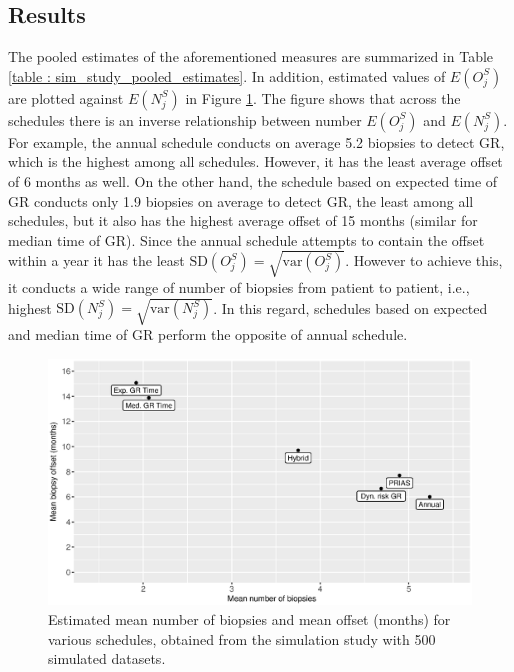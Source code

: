 \subsection{Results}
The pooled estimates of the aforementioned measures are summarized in Table \ref{table : sim_study_pooled_estimates}. In addition, estimated values of $E(O^S_j)$ are plotted against $E(N^S_j)$ in Figure \ref{fig : meanNbVsOffset}. The figure shows that across the schedules there is an inverse relationship between number $E(O^S_j)$ and $E(N^S_j)$. For example, the annual schedule conducts on average 5.2 biopsies to detect GR, which is the highest among all schedules. However, it has the least average offset of 6 months as well. On the other hand, the schedule based on expected time of GR conducts only 1.9 biopsies on average to detect GR, the least among all schedules, but it also has the highest average offset of 15 months (similar for median time of GR). Since the annual schedule attempts to contain the offset within a year it has the least $\mbox{SD}(O^S_j) = \sqrt{\mbox{var}(O^S_j)}$. However to achieve this, it conducts a wide range of number of biopsies from patient to patient, i.e., highest $\mbox{SD}(N^S_j) = \sqrt{\mbox{var}(N^S_j)}$. In this regard, schedules based on expected and median time of GR perform the opposite of annual schedule.

\begin{figure}
\centerline{\includegraphics[width=\columnwidth]{images/sim_study/meanNbVsOffset_all.eps}}
\caption{Estimated mean number of biopsies and mean offset (months) for various schedules, obtained from the simulation study with 500 simulated datasets.}
\label{fig : meanNbVsOffset}
\end{figure}


